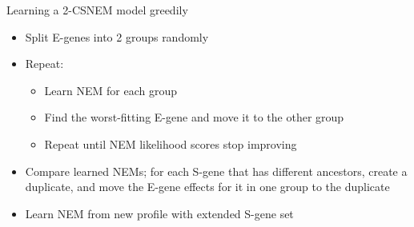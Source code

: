 \documentclass{beamer}
\begin{document}
\begin{frame}{Learning a 2-CSNEM model greedily}
\begin{itemize}
 \item Split E-genes into 2 groups randomly
 \item Repeat:
 \begin{itemize}\normalsize
  \item Learn NEM for each group
  \item Find the worst-fitting E-gene and move it to the other group
  \item Repeat until NEM likelihood scores stop improving
 \end{itemize}
 \item Compare learned NEMs; for each S-gene that has different ancestors, create a duplicate, and move the E-gene effects for it in one group to the duplicate
 \item Learn NEM from new profile with extended S-gene set
\end{itemize}
\end{frame}
\end{document}
